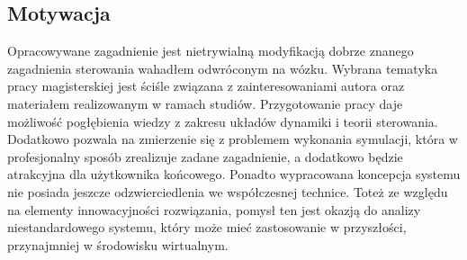 \documentclass[12pt, oneside]{report}
\theoremstyle{definition}
\begin{document}
\subsection{Motywacja}
Opracowywane zagadnienie jest nietrywialną modyfikacją dobrze znanego zagadnienia sterowania wahadłem odwróconym na wózku. Wybrana tematyka pracy magisterskiej jest ściśle związana z zainteresowaniami autora oraz materiałem realizowanym w ramach studiów. Przygotowanie pracy daje możliwość pogłębienia wiedzy z zakresu układów dynamiki i teorii sterowania. Dodatkowo pozwala na zmierzenie się z problemem wykonania symulacji, która w profesjonalny sposób zrealizuje zadane zagadnienie, a dodatkowo będzie atrakcyjna dla użytkownika końcowego. Ponadto wypracowana koncepcja systemu nie posiada jeszcze odzwierciedlenia we współczesnej technice. Toteż ze względu na elementy innowacyjności rozwiązania, pomysł ten jest okazją do analizy niestandardowego systemu, który może mieć zastosowanie w przyszłości, przynajmniej w środowisku wirtualnym.
\end{document}
